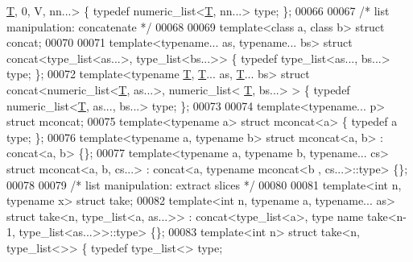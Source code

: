 \begin{DoxyCode}
      \hyperlink{group___sparse_core___module_class_eigen_1_1_triplet}{T}, 0, V, nn...> \{ \textcolor{keyword}{typedef} numeric\_list<\hyperlink{group___sparse_core___module_class_eigen_1_1_triplet}{T}, nn...> type; \};
00066 
00067 \textcolor{comment}{/* list manipulation: concatenate */}
00068 
00069 \textcolor{keyword}{template}<\textcolor{keyword}{class} a, \textcolor{keyword}{class} b> \textcolor{keyword}{struct }concat;
00070 
00071 \textcolor{keyword}{template}<\textcolor{keyword}{typename}... as, \textcolor{keyword}{typename}... bs> \textcolor{keyword}{struct }concat<type\_list<as...>,       type\_list<bs...>>        \{ \textcolor{keyword}{
      typedef} type\_list<as..., bs...> type; \};
00072 \textcolor{keyword}{template}<\textcolor{keyword}{typename} \hyperlink{group___sparse_core___module_class_eigen_1_1_triplet}{T}, \hyperlink{group___sparse_core___module_class_eigen_1_1_triplet}{T}... as, \hyperlink{group___sparse_core___module_class_eigen_1_1_triplet}{T}... bs>   \textcolor{keyword}{struct }concat<numeric\_list<\hyperlink{group___sparse_core___module_class_eigen_1_1_triplet}{T}, as...>, numeric\_list<
      \hyperlink{group___sparse_core___module_class_eigen_1_1_triplet}{T}, bs...> > \{ \textcolor{keyword}{typedef} numeric\_list<\hyperlink{group___sparse_core___module_class_eigen_1_1_triplet}{T}, as..., bs...> type; \};
00073 
00074 \textcolor{keyword}{template}<\textcolor{keyword}{typename}... p> \textcolor{keyword}{struct }mconcat;
00075 \textcolor{keyword}{template}<\textcolor{keyword}{typename} a>                             \textcolor{keyword}{struct }mconcat<a>           \{ \textcolor{keyword}{typedef} a type; \};
00076 \textcolor{keyword}{template}<\textcolor{keyword}{typename} a, \textcolor{keyword}{typename} b>                 \textcolor{keyword}{struct }mconcat<a, b>        : concat<a, b> \{\};
00077 \textcolor{keyword}{template}<\textcolor{keyword}{typename} a, \textcolor{keyword}{typename} b, \textcolor{keyword}{typename}... cs> \textcolor{keyword}{struct }mconcat<a, b, cs...> : concat<a, typename mconcat<b
      , cs...>::type> \{\};
00078 
00079 \textcolor{comment}{/* list manipulation: extract slices */}
00080 
00081 \textcolor{keyword}{template}<\textcolor{keywordtype}{int} n, \textcolor{keyword}{typename} x> \textcolor{keyword}{struct }take;
00082 \textcolor{keyword}{template}<\textcolor{keywordtype}{int} n, \textcolor{keyword}{typename} a, \textcolor{keyword}{typename}... as> \textcolor{keyword}{struct }take<n, type\_list<a, as...>> : concat<type\_list<a>, type
      name take<n-1, type\_list<as...>>::type> \{\};
00083 \textcolor{keyword}{template}<\textcolor{keywordtype}{int} n>                             \textcolor{keyword}{struct }take<n, type\_list<>>         \{ \textcolor{keyword}{typedef} type\_list<> type;

\end{DoxyCode}
